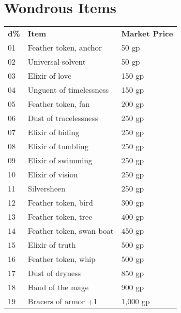 \section{Wondrous Items}


\setlength{\tabcolsep}{1pt}
\begin{xtabular}{lll}
\textbf{d\%} & \textbf{Item}                      & \textbf{Market Price} \\
01  & Feather token, anchor                       & 50 gp        \\
02  & Universal solvent                           & 50 gp        \\
03  & Elixir of love                              & 150 gp       \\
04  & Unguent of timelessness                     & 150 gp       \\
05  & Feather token, fan                          & 200 gp       \\
06  & Dust of tracelessness                       & 250 gp       \\
07  & Elixir of hiding                            & 250 gp       \\
08  & Elixir of tumbling                          & 250 gp       \\
09  & Elixir of swimming                          & 250 gp       \\
10  & Elixir of vision                            & 250 gp       \\
11  & Silversheen                                 & 250 gp       \\
12  & Feather token, bird                         & 300 gp       \\
13  & Feather token, tree                         & 400 gp       \\
14  & Feather token, swan boat                    & 450 gp       \\
15  & Elixir of truth                             & 500 gp       \\
16  & Feather token, whip                         & 500 gp       \\
17  & Dust of dryness                             & 850 gp       \\
18  & Hand of the mage                            & 900 gp       \\
19  & Bracers of armor +1                         & 1,000 gp     \\

\end{xtabular}
